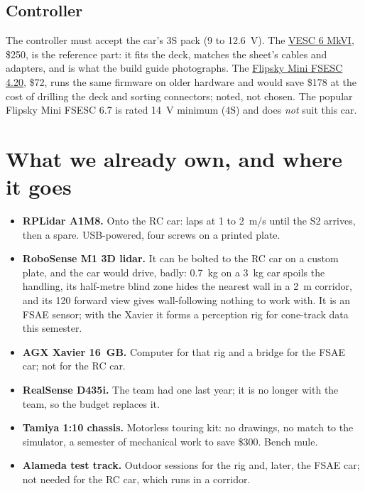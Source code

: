 \documentclass[11pt,a4paper]{article}
\begin{document}
\subsection*{Controller}
The controller must accept the car's 3S pack (9 to 12.6~V). The
\href{https://trampaboards.com/vesc-6-mkvi--12s-c-1630.html}{VESC 6 MkVI}, \$250, is the
reference part: it fits the deck, matches the sheet's cables and adapters, and is what the
build guide photographs. The \href{https://www.amazon.com/dp/B08725X8CT}{Flipsky Mini FSESC
4.20}, \$72, runs the same firmware on older hardware and would save \$178 at the cost of
drilling the deck and sorting connectors; noted, not chosen. The popular Flipsky Mini FSESC
6.7 is rated 14~V minimum (4S) and does \emph{not} suit this car.

\section{What we already own, and where it goes}

\begin{itemize}
  \item \textbf{RPLidar A1M8.} Onto the RC car: laps at 1 to 2~m/s until the S2 arrives, then a spare. USB-powered, four screws on a printed plate.
  \item \textbf{RoboSense M1 3D lidar.} It can be bolted to the RC car on a custom plate, and the car would drive, badly: 0.7~kg on a 3~kg car spoils the handling, its half-metre blind zone hides the nearest wall in a 2~m corridor, and its 120\textdegree{} forward view gives wall-following nothing to work with. It is an FSAE sensor; with the Xavier it forms a perception rig for cone-track data this semester.
  \item \textbf{AGX Xavier 16~GB.} Computer for that rig and a bridge for the FSAE car; not for the RC car.
  \item \textbf{RealSense D435i.} The team had one last year; it is no longer with the team, so the budget replaces it.
  \item \textbf{Tamiya 1:10 chassis.} Motorless touring kit: no drawings, no match to the simulator, a semester of mechanical work to save \$300. Bench mule.
  \item \textbf{Alameda test track.} Outdoor sessions for the rig and, later, the FSAE car; not needed for the RC car, which runs in a corridor.
\end{itemize}


\end{document}

